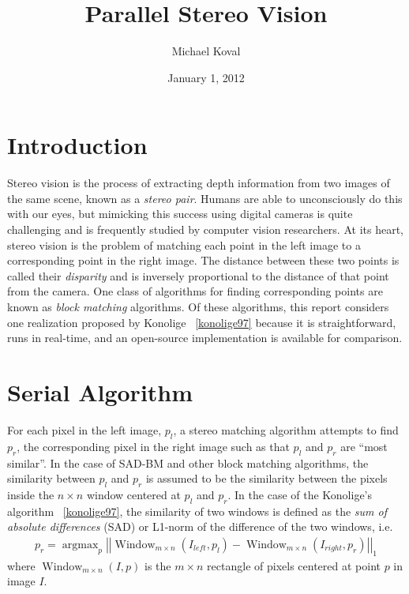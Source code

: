 \documentclass{article}
\title{Parallel Stereo Vision}
\author{Michael Koval}
\date{January 1, 2012}
\DeclareMathOperator{\argmax}{argmax}
\DeclareMathOperator{\Window}{Window}
\begin{document}
\maketitle

\section{Introduction}
\label{sec:intro}
Stereo vision is the process of extracting depth information from two images of
the same scene, known as a \textit{stereo pair}. Humans are able to
unconsciously do this with our eyes, but mimicking this success using digital
cameras is quite challenging and is frequently studied by computer vision
researchers. At its heart, stereo vision is the problem of matching each point
in the left image to a corresponding point in the right image. The distance
between these two points is called their \textit{disparity} and is inversely
proportional to the distance of that point from the camera. One class of
algorithms for finding corresponding points are known as \textit{block
matching} algorithms. Of these algorithms, this report considers one
realization proposed by Konolige ~\ref{konolige97} because it is
straightforward, runs in real-time, and an open-source implementation is
available for comparison.

\section{Serial Algorithm}
\label{sec:serial}
For each pixel in the left image, $p_l$, a stereo matching algorithm attempts
to find $p_r$, the corresponding pixel in the right image such as that $p_l$
and $p_r$ are ``most similar''. In the case of SAD-BM and other block matching
algorithms, the similarity between $p_l$ and $p_r$ is assumed to be the
similarity between the pixels inside the $n \times n$ window centered at $p_l$
and $p_r$. In the case of the Konolige's algorithm ~\ref{konolige97}, the
similarity of two windows is defined as the \textit{sum of absolute
differences} (SAD) or L1-norm of the difference of the two windows, i.e.
\begin{align*}
    p_r = \argmax_p \left|\left|\Window_{m \times n}(I_{left}, p_l)
          - \Window_{m \times n}(I_{right}, p_r)\right|\right|_1
\end{align*}
where $\Window_{m \times n}(I, p)$ is the $m \times n$ rectangle of pixels
centered at point $p$ in image $I$.
\end{document}

